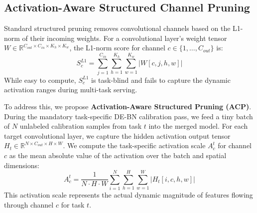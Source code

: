 \documentclass{article}
\theoremstyle{plain}
\theoremstyle{definition}
\theoremstyle{remark}
\begin{document}
\subsection{Activation-Aware Structured Channel Pruning}
Standard structured pruning removes convolutional channels based on the L1-norm of their incoming weights. For a convolutional layer's weight tensor $W \in \mathbb{R}^{C_{out} \times C_{in} \times K_h \times K_w}$, the L1-norm score for channel $c \in \{1, \dots, C_{out}\}$ is:
\begin{equation}
    S^{L1}_c = \sum_{j=1}^{C_{in}} \sum_{h=1}^{K_h} \sum_{w=1}^{K_w} |W[c, j, h, w]|
\end{equation}
While easy to compute, $S^{L1}_c$ is task-blind and fails to capture the dynamic activation ranges during multi-task serving.

To address this, we propose \textbf{Activation-Aware Structured Pruning (ACP)}. During the mandatory task-specific DE-BN calibration pass, we feed a tiny batch of $N$ unlabeled calibration samples from task $t$ into the merged model. For each target convolutional layer, we capture the hidden activation output tensor $H_t \in \mathbb{R}^{N \times C_{out} \times H \times W}$. We compute the task-specific activation scale $A^t_c$ for channel $c$ as the mean absolute value of the activation over the batch and spatial dimensions:
\begin{equation}
    A^t_c = \frac{1}{N \cdot H \cdot W} \sum_{i=1}^N \sum_{h=1}^H \sum_{w=1}^W |H_t[i, c, h, w]|
\end{equation}
This activation scale represents the actual dynamic magnitude of features flowing through channel $c$ for task $t$.
\end{document}
